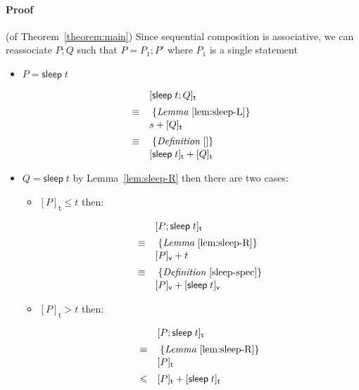 \documentclass[preprint]{sigplanconf}
\renewcommand{\leq}{\leqslant}
\newcommand{\note}[1]{{\color{blue}{#1}}}
\theoremstyle{definition}
\newcommand{\sleep}{\mathsf{sleep}\;}
\newcommand{\vtime}[1]{[#1]_{\mathsf{v}}}
\newcommand{\etime}[1]{[#1]_{\mathsf{t}}}
\begin{document}


\appendix



\paragraph{Proof} (of Theorem~\ref{theorem:main})
\note{These are just rough notes}
Since sequential composition is associative, we can reassociate
$P; Q$ such that $P = P_1; P'$ where $P_1$ is a single statement

\begin{itemize}
\item $P = \sleep t$

\begin{align*}
\begin{array}{ll}
       & \etime{\sleep t; Q} \\[0.5em]
\equiv & \; \{\textit{Lemma}~\ref{lem:sleep-L}\} \\[0.1em]
       & s + \etime{Q} \\[0.5em]
\equiv & \; \{\textit{Definition}~\ref{}\} \\[0.1em]
       & \etime{\sleep t} + \etime{Q}
\end{array}
\end{align*}

\item $Q = \sleep t$ by Lemma~\ref{lem:sleep-R} then 
there are two cases:

\begin{itemize}
\item $\etime{P} \leq t$ then:

\begin{align*}
\begin{array}{ll}
       & \etime{P; \sleep t} \\[0.5em]
\equiv & \; \{\textit{Lemma}~\ref{lem:sleep-R}\} \\[0.1em]
       & \vtime{P} + t \\[0.5em]
\equiv & \; \{\textit{Definition}~\ref{sleep-spec}\} \\[0.1em]
       & \vtime{P} + \vtime{\sleep t}
\end{array}
\end{align*}

\item $\etime{P} > t$ then:

\begin{align*}
\begin{array}{ll}
       & \etime{P; \sleep t} \\[0.5em]
\equiv & \; \{\textit{Lemma}~\ref{lem:sleep-R}\} \\[0.1em]
       & \etime{P} \\[0.5em]
\leq   & \etime{P} + \etime{\sleep t}
\end{array}
\end{align*}


\end{itemize}
\end{itemize}
\end{document}
